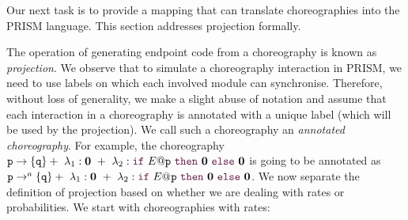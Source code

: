 Our next task is to provide a mapping that can translate
choreographies into the PRISM language. This section addresses
projection formally.

  The operation of generating
endpoint code from a choreography is known as {\em
  projection}. 
We observe that to simulate a choreography interaction in
PRISM, we need to use labels on which each involved module can
synchronise. Therefore, without loss of generality, we make a slight
abuse of notation and assume that each interaction in a choreography
is annotated with a unique label (which will be used by the
projection). We call such a choreography an {\em annotated
  choreography}. For example, the choreography
$\interactBase{p}{q} +\ \lambda_1: \CEnd \ +\ \lambda_2: \ifTE
  {E}{p}{\CEnd}{\CEnd}$ is going to be annotated as
  $\interactBasel{p}{a}{q} +\ \lambda_1: \CEnd \ +\ \lambda_2: \ifTEl
    {E}{}{p}{\CEnd}{\CEnd}$.
We now separate the definition of projection based on whether we
are dealing with rates or probabilities.  We start with choreographies 
with rates: 
% 

